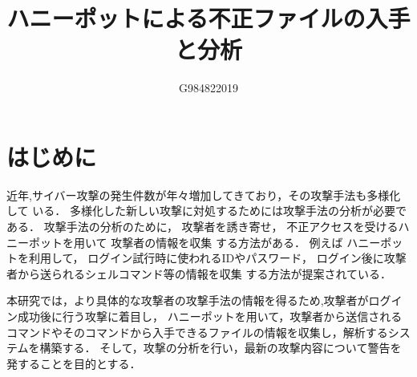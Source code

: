 \documentclass{entry}
\title{ハニーポットによる不正ファイルの入手と分析}
\author{G984822019}{吉村　直将}
\begin{document}
\maketitle

\section{はじめに}

近年,サイバー攻撃の発生件数が年々増加してきており，その攻撃手法も多様化して
いる．
多様化した新しい攻撃に対処するためには攻撃手法の分析が必要である．
攻撃手法の分析のために，  
攻撃者を誘き寄せ，
不正アクセスを受けるハニーポットを用いて
攻撃者の情報を収集
する方法がある．
例えば
ハニーポットを利用して，
ログイン試行時に使われるIDやパスワード，
ログイン後に攻撃者から送られるシェルコマンド等の情報を収集
する方法が提案されている\cite{Entry}．





本研究では，より具体的な攻撃者の攻撃手法の情報を得るため,攻撃者がログイン成功後に行う攻撃に着目し，
ハニーポットを用いて，攻撃者から送信されるコマンドやそのコマンドから入手できるファイルの情報を収集し，解析するシステムを構築する．
そして，攻撃の分析を行い，最新の攻撃内容について警告を発することを目的とする．
\end{document}
